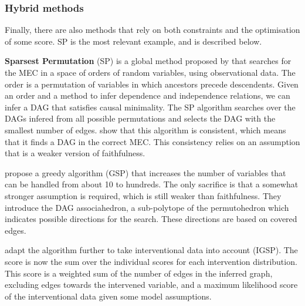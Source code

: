 \subsubsection{Hybrid methods}

Finally, there are also methods that rely on both constraints and the optimisation of some score. SP is the most relevant example, and is described below.

\textbf{Sparsest Permutation} (SP) is a global method proposed by \citet{raskutti2018learning} that searches for the MEC in a space of orders of random variables, using observational data. The order is a permutation of variables in which ancestors precede descendents. Given an order and a method to infer dependence and independence relations, we can infer a DAG that satisfies causal minimality. The SP algorithm searches over the DAGs infered from all possible permutations and selects the DAG with the smallest number of edges. \citet{raskutti2018learning} show that this algorithm is consistent, which means that it finds a DAG in the correct MEC. This consistency relies on an assumption that is a weaker version of faithfulness. 

\citet{solus2017consistency} propose a greedy algorithm (GSP) that increases the number of variables that can be handled from about 10 to hundreds. The only sacrifice is that a somewhat stronger assumption is required, which is still weaker than faithfulness. They introduce the DAG associahedron, a sub-polytope of the permutohedron which indicates possible directions for the search. These directions are based on covered edges. 

\citet{wang2017permutation} adapt the algorithm further to take interventional data into account (IGSP). The score is now the sum over the individual scores for each intervention distribution. This score is a weighted sum of the number of edges in the inferred graph, excluding edges towards the intervened variable, and a maximum likelihood score of the interventional data given some model assumptions.







